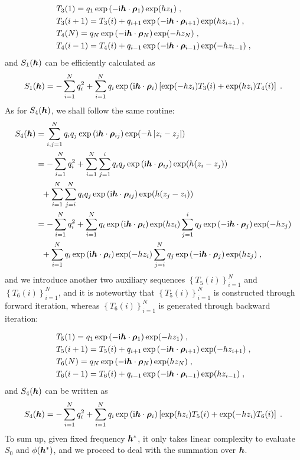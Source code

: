 \begin{align*}
    &T_3(1)=q_1\exp{(-\mathrm{i} \boldsymbol{h} \cdot \boldsymbol{\rho}_{1})}\exp(hz_1)\;,\\
    &T_3(i+1)=T_3(i)+q_{i+1}\exp{(-\mathrm{i} \boldsymbol{h} \cdot \boldsymbol{\rho}_{i+1})}\exp(hz_{i+1})\;,\\
    &T_4(N)=q_N\exp{(-\mathrm{i} \boldsymbol{h} \cdot \boldsymbol{\rho}_{N})}\exp(-hz_N)\;,\\
    &T_4(i-1)=T_4(i)+q_{i-1}\exp{(-\mathrm{i} \boldsymbol{h} \cdot \boldsymbol{\rho}_{i-1})}\exp(-hz_{i-1})\;,
\end{align*}
and
$S_1(\boldsymbol{h})$ can be efficiently calculated as
\[
S_1(\boldsymbol{h})= -\sum_{i=1}^Nq_i^2+ \sum_{i=1}^N q_i\exp{(\mathrm{i} \boldsymbol{h} \cdot \boldsymbol{\rho}_{i})}\left[\exp(-hz_i)T_3(i)+\exp(hz_i)T_4(i)\right]\;.
\]
As for $S_4(\boldsymbol{h})$, we shall follow the same routine:
\begin{align*}
S_4(\boldsymbol{h})&=\sum_{i,j=1}^Nq_iq_j  \exp{(\mathrm{i} \boldsymbol{h} \cdot \boldsymbol{\rho}_{ij})}\exp(-h\left\lvert z_i-z_j\right\rvert)\\
&=-\sum_{i=1}^Nq_i^2+\sum_{i=1}^N \sum_{j=1}^iq_iq_j  \exp{(\mathrm{i} \boldsymbol{h} \cdot \boldsymbol{\rho}_{ij})}\exp(h(z_i-z_j))\\
&~~+\sum_{i=1}^N \sum_{j=i}^Nq_iq_j  \exp{(\mathrm{i} \boldsymbol{h} \cdot \boldsymbol{\rho}_{ij})}\exp(h(z_j-z_i))\\
&= -\sum_{i=1}^Nq_i^2+\sum_{i=1}^N q_i\exp{(\mathrm{i} \boldsymbol{h} \cdot \boldsymbol{\rho}_{i})}\exp(hz_i)\sum_{j=1}^iq_j\exp{(-\mathrm{i} \boldsymbol{h} \cdot \boldsymbol{\rho}_{j})}\exp(-hz_j)\\
&~~+\sum_{i=1}^N q_i\exp{(\mathrm{i} \boldsymbol{h} \cdot \boldsymbol{\rho}_{i})}\exp(-hz_i)\sum_{j=i}^Nq_j\exp{(-\mathrm{i} \boldsymbol{h} \cdot \boldsymbol{\rho}_{j})}\exp(hz_j)\;,
\end{align*}
and we introduce another two auxiliary sequences  $\left\{T_5(i)\right\}_{i=1}^N$ and $\left\{T_6(i)\right\}_{i=1}^N$, and it is noteworthy that $\left\{T_5(i)\right\}_{i=1}^N$ is  constructed through forward iteration, whereas  $\left\{T_6(i)\right\}_{i=1}^N$   is generated through backward iteration:

\begin{align*}
    &T_5(1)=q_1\exp{(-\mathrm{i} \boldsymbol{h} \cdot \boldsymbol{\rho}_{1})}\exp(-hz_1)\;,\\
    &T_5(i+1)=T_5(i)+q_{i+1}\exp{(-\mathrm{i} \boldsymbol{h} \cdot \boldsymbol{\rho}_{i+1})}\exp(-hz_{i+1})\;,\\
    &T_6(N)=q_N\exp{(-\mathrm{i} \boldsymbol{h} \cdot \boldsymbol{\rho}_{N})}\exp(hz_N)\;,\\
    &T_6(i-1)=T_6(i)+q_{i-1}\exp{(-\mathrm{i} \boldsymbol{h} \cdot \boldsymbol{\rho}_{i-1})}\exp(hz_{i-1})\;,
\end{align*}
and $S_4(\boldsymbol{h})$ can be written as
\[
S_4(\boldsymbol{h})= -\sum_{i=1}^Nq_i^2+ \sum_{i=1}^N q_i\exp{(\mathrm{i} \boldsymbol{h} \cdot \boldsymbol{\rho}_{i})}\left[\exp(hz_i)T_5(i)+\exp(-hz_i)T_6(i)\right]\;.
\]
To sum up, given fixed frequency $\boldsymbol{h}^\ast$, it only takes  linear complexity to evaluate $S_0$ and $\phi(\boldsymbol{h}^\ast)$, and we proceed to deal with the   summation over $\boldsymbol{h}$. 

